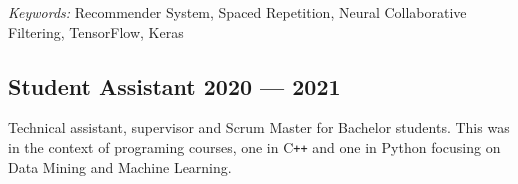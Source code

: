 \textit{Keywords:} Recommender System, Spaced Repetition, Neural Collaborative Filtering, TensorFlow, Keras
\vspace{0.35\baselineskip}

\subsection{Student Assistant \hfill 2020 --- 2021}
\vspace{0.7\baselineskip}

Technical assistant, supervisor and Scrum Master for Bachelor students. This was in the context of programing courses,
one in C\texttt{++} and one in Python focusing on Data Mining and Machine Learning.

\vspace{0.35\baselineskip}






